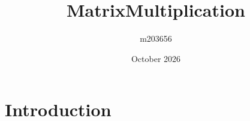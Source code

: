 \documentclass{article}
\title{MatrixMultiplication}
\author{m203656 }
\date{October 2026}
\begin{document}
\maketitle

\section{Introduction}
\end{document}
